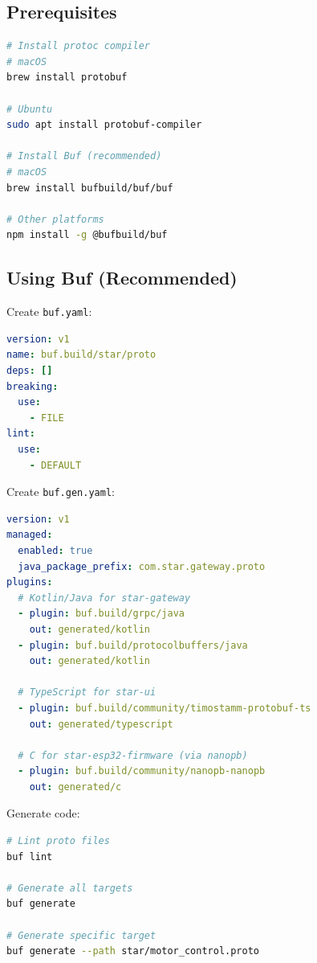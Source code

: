 \documentclass[11pt,letterpaper]{article}
\begin{document}
\subsection{Prerequisites}

\begin{lstlisting}[language=bash]
# Install protoc compiler
# macOS
brew install protobuf

# Ubuntu
sudo apt install protobuf-compiler

# Install Buf (recommended)
# macOS
brew install bufbuild/buf/buf

# Other platforms
npm install -g @bufbuild/buf
\end{lstlisting}

\subsection{Using Buf (Recommended)}

Create \texttt{buf.yaml}:

\begin{lstlisting}[language=yaml, caption=buf.yaml]
version: v1
name: buf.build/star/proto
deps: []
breaking:
  use:
    - FILE
lint:
  use:
    - DEFAULT
\end{lstlisting}

Create \texttt{buf.gen.yaml}:

\begin{lstlisting}[language=yaml, caption=buf.gen.yaml]
version: v1
managed:
  enabled: true
  java_package_prefix: com.star.gateway.proto
plugins:
  # Kotlin/Java for star-gateway
  - plugin: buf.build/grpc/java
    out: generated/kotlin
  - plugin: buf.build/protocolbuffers/java
    out: generated/kotlin

  # TypeScript for star-ui
  - plugin: buf.build/community/timostamm-protobuf-ts
    out: generated/typescript

  # C for star-esp32-firmware (via nanopb)
  - plugin: buf.build/community/nanopb-nanopb
    out: generated/c
\end{lstlisting}

Generate code:

\begin{lstlisting}[language=bash]
# Lint proto files
buf lint

# Generate all targets
buf generate

# Generate specific target
buf generate --path star/motor_control.proto
\end{lstlisting}
\end{document}
